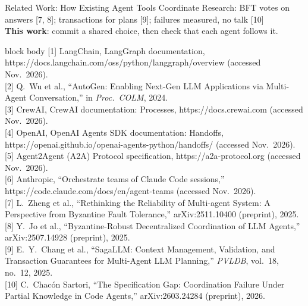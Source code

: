 \documentclass[aspectratio=169,11pt]{beamer}
\newcommand{\papercite}[1]{%
  \vfill
  \begin{beamercolorbox}[wd=\textwidth,sep=3pt]{block body}
    \tiny #1
  \end{beamercolorbox}}
\begin{document}
\begin{frame}{Related Work: How Existing Agent Tools Coordinate}
  \vspace{0.2em}
  \pause
  Research: BFT votes on answers [7, 8]; transactions for plans [9]; failures measured, no talk [10]\\
  \textbf{This work}: commit a shared choice, then check that each agent follows it.
  \papercite{
  [1] LangChain, LangGraph documentation, https://docs.langchain.com/oss/python/langgraph/overview (accessed Nov.\ 2026).\\
  {}[2] Q.\ Wu et al., ``AutoGen: Enabling Next-Gen LLM Applications via Multi-Agent Conversation,'' in \textit{Proc.\ COLM}, 2024.\\
  {}[3] CrewAI, CrewAI documentation: Processes, https://docs.crewai.com (accessed Nov.\ 2026).\\
  {}[4] OpenAI, OpenAI Agents SDK documentation: Handoffs, https://openai.github.io/openai-agents-python/handoffs/ (accessed Nov.\ 2026).\\
  {}[5] Agent2Agent (A2A) Protocol specification, https://a2a-protocol.org (accessed Nov.\ 2026).\\
  {}[6] Anthropic, ``Orchestrate teams of Claude Code sessions,'' https://code.claude.com/docs/en/agent-teams (accessed Nov.\ 2026).\\
  {}[7] L.\ Zheng et al., ``Rethinking the Reliability of Multi-agent System: A Perspective from Byzantine Fault Tolerance,'' arXiv:2511.10400 (preprint), 2025.\\
  {}[8] Y.\ Jo et al., ``Byzantine-Robust Decentralized Coordination of LLM Agents,'' arXiv:2507.14928 (preprint), 2025.\\
  {}[9] E.\ Y.\ Chang et al., ``SagaLLM: Context Management, Validation, and Transaction Guarantees for Multi-Agent LLM Planning,'' \textit{PVLDB}, vol.\ 18, no.\ 12, 2025.\\
  {}[10] C.\ Chac\'on Sartori, ``The Specification Gap: Coordination Failure Under Partial Knowledge in Code Agents,'' arXiv:2603.24284 (preprint), 2026.}
\end{frame}

\end{document}
